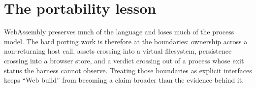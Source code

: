 \section{The portability lesson}

WebAssembly preserves much of the language and loses much of the process model.  The hard
porting work is therefore at the boundaries: ownership across a non-returning host call,
assets crossing into a virtual filesystem, persistence crossing into a browser store, and a
verdict crossing out of a process whose exit status the harness cannot observe.  Treating
those boundaries as explicit interfaces keeps ``Web build'' from becoming a claim broader
than the evidence behind it.
